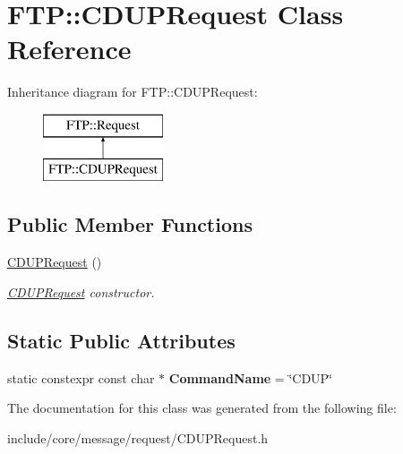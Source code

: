 \hypertarget{class_f_t_p_1_1_c_d_u_p_request}{\section{F\-T\-P\-:\-:C\-D\-U\-P\-Request Class Reference}
\label{class_f_t_p_1_1_c_d_u_p_request}
}
Inheritance diagram for F\-T\-P\-:\-:C\-D\-U\-P\-Request\-:\begin{figure}[H]
\begin{center}
\leavevmode
\includegraphics[height=2.000000cm]{class_f_t_p_1_1_c_d_u_p_request}
\end{center}
\end{figure}
\subsection*{Public Member Functions}
\begin{DoxyCompactItemize}
\item 
\hypertarget{class_f_t_p_1_1_c_d_u_p_request_ab15198847bffc2563c46b9ff0b6dd58f}{\hyperlink{class_f_t_p_1_1_c_d_u_p_request_ab15198847bffc2563c46b9ff0b6dd58f}{C\-D\-U\-P\-Request} ()}\label{class_f_t_p_1_1_c_d_u_p_request_ab15198847bffc2563c46b9ff0b6dd58f}

\begin{DoxyCompactList}\small\item\em \hyperlink{class_f_t_p_1_1_c_d_u_p_request}{C\-D\-U\-P\-Request} constructor. \end{DoxyCompactList}\end{DoxyCompactItemize}
\subsection*{Static Public Attributes}
\begin{DoxyCompactItemize}
\item 
\hypertarget{class_f_t_p_1_1_c_d_u_p_request_a3acde3ab0a847af43a10420065dcd535}{static constexpr const char $\ast$ {\bfseries Command\-Name} = \char`\"{}C\-D\-U\-P\char`\"{}}\label{class_f_t_p_1_1_c_d_u_p_request_a3acde3ab0a847af43a10420065dcd535}

\end{DoxyCompactItemize}


The documentation for this class was generated from the following file\-:\begin{DoxyCompactItemize}
\item 
include/core/message/request/C\-D\-U\-P\-Request.\-h\end{DoxyCompactItemize}

